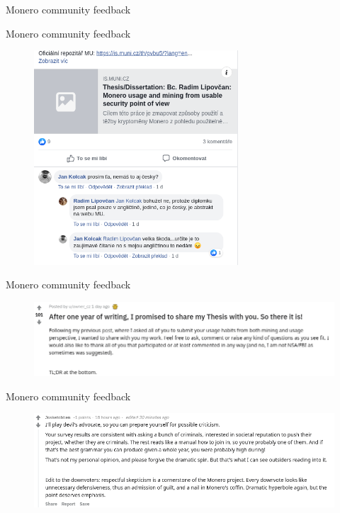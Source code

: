 \documentclass{beamer}
\begin{document}
\begin{darkframes}
        \begin{frame}{Monero community feedback}
    \end{frame}
       \begin{frame}{Monero community feedback}
     	\begin{figure}
  \centering
  \includegraphics[width=0.68\textwidth]{community-facebook.png}
\end{figure}
    \end{frame}    
    \begin{frame}{Monero community feedback}
     	\begin{figure}
  \centering
  \includegraphics[width=1\textwidth]{community-reddit.png}
\end{figure}
    \end{frame}
        \begin{frame}{Monero community feedback}
     	\begin{figure}
  \centering
  \includegraphics[width=1\textwidth]{community-redditnext.png}
\end{figure}
    \end{frame}
      

\end{darkframes}
\end{document}
